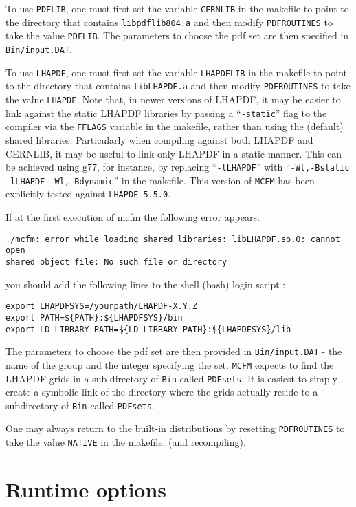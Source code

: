 \documentclass[12pt]{article}
\begin{document}
To use {\tt PDFLIB}, one must first set the variable {\tt CERNLIB}
in the makefile to point to the directory that contains
{\tt libpdflib804.a} and then modify {\tt PDFROUTINES} to
take the value {\tt PDFLIB}. The parameters to choose the
pdf set are then specified in {\tt Bin/input.DAT}.

To use {\tt LHAPDF}, one must first set the variable {\tt LHAPDFLIB}
in the makefile to point to the directory that contains
{\tt libLHAPDF.a} and then modify {\tt PDFROUTINES} to
take the value {\tt LHAPDF}. Note that, in newer versions of LHAPDF,
it may be easier to link against the static LHAPDF libraries by passing
a ``{\tt -static}'' flag to the compiler via the {\tt FFLAGS} variable
in the makefile, rather than using the (default) shared libraries.
Particularly when compiling against both LHAPDF and CERNLIB, it may
be useful to link only LHAPDF in a static manner. This can be achieved
using g77, for instance, by replacing
 ``{\tt -lLHAPDF}'' with ``{\tt -Wl,-Bstatic -lLHAPDF -Wl,-Bdynamic}''
in the makefile. This version of {\tt MCFM} has been explicitly tested
against {\tt LHAPDF-5.5.0}.

If at the first execution of mcfm the following error appears:
\begin{verbatim}
./mcfm: error while loading shared libraries: libLHAPDF.so.0: cannot open
shared object file: No such file or directory
\end{verbatim}

you should add the following lines to the shell (bash) login script :
\begin{verbatim}
export LHAPDFSYS=/yourpath/LHAPDF-X.Y.Z
export PATH=${PATH}:${LHAPDFSYS}/bin
export LD_LIBRARY PATH=${LD_LIBRARY PATH}:${LHAPDFSYS}/lib
\end{verbatim}

The parameters to choose the
pdf set are then provided in {\tt Bin/input.DAT} - 
the name of the group and the integer specifying 
the set.
{\tt MCFM} expects to find the LHAPDF grids in a sub-directory of {\tt Bin} called
{\tt PDFsets}. It is easiest to simply create a symbolic link of the directory where the
grids actually reside to a subdirectory of {\tt Bin} called {\tt PDFsets}.

One may always return to the built-in distributions by resetting
{\tt PDFROUTINES} to take the value {\tt NATIVE}  in the makefile,
(and recompiling).

\section{Runtime options}
\end{document}
